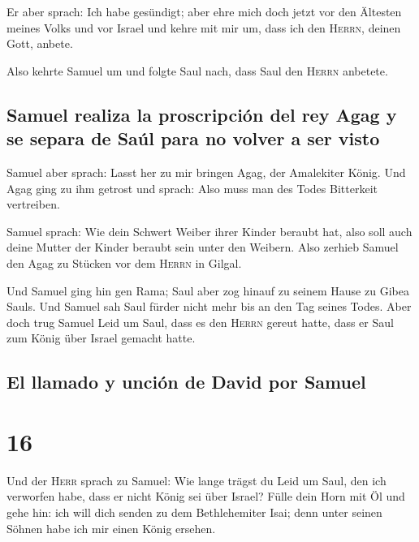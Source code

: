  Er aber sprach: Ich habe gesündigt; aber ehre mich doch
jetzt vor den Ältesten meines Volks und vor Israel und kehre mit mir um,
dass ich den \textsc{Herrn}, deinen Gott, anbete.

 Also kehrte Samuel um und folgte Saul nach, dass Saul
den \textsc{Herrn} anbetete.

\hypertarget{samuel-realiza-la-proscripciuxf3n-del-rey-agag-y-se-separa-de-sauxfal-para-no-volver-a-ser-visto}{%
\subsection{Samuel realiza la proscripción del rey Agag y se separa de
Saúl para no volver a ser
visto}\label{samuel-realiza-la-proscripciuxf3n-del-rey-agag-y-se-separa-de-sauxfal-para-no-volver-a-ser-visto}}

 Samuel aber sprach: Lasst her zu mir bringen Agag, der
Amalekiter König. Und Agag ging zu ihm getrost und sprach: Also muss man
des Todes Bitterkeit vertreiben.

 Samuel sprach: Wie dein Schwert Weiber ihrer Kinder
beraubt hat, also soll auch deine Mutter der Kinder beraubt sein unter
den Weibern. Also zerhieb Samuel den Agag zu Stücken vor dem
\textsc{Herrn} in Gilgal.

 Und Samuel ging hin gen Rama; Saul aber zog hinauf zu
seinem Hause zu Gibea Sauls.  Und Samuel sah Saul fürder
nicht mehr bis an den Tag seines Todes. Aber doch trug Samuel Leid um
Saul, dass es den \textsc{Herrn} gereut hatte, dass er Saul zum König
über Israel gemacht hatte.

\hypertarget{el-llamado-y-unciuxf3n-de-david-por-samuel}{%
\subsection{El llamado y unción de David por
Samuel}\label{el-llamado-y-unciuxf3n-de-david-por-samuel}}

\hypertarget{section-15}{%
\section{16}\label{section-15}}

 Und der \textsc{Herr} sprach zu Samuel: Wie lange trägst
du Leid um Saul, den ich verworfen habe, dass er nicht König sei über
Israel? Fülle dein Horn mit Öl und gehe hin: ich will dich senden zu dem
Bethlehemiter Isai; denn unter seinen Söhnen habe ich mir einen König
ersehen.

